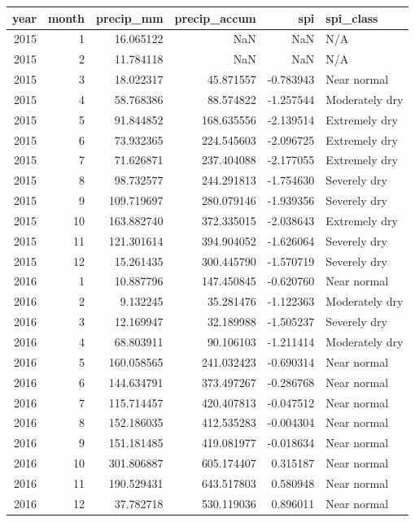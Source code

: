 \begin{tabular}{rrrrrl}
\toprule
year & month & precip\_mm & precip\_accum & spi & spi\_class \\
\midrule
2015 & 1 & 16.065122 & NaN & NaN & N/A \\
2015 & 2 & 11.784118 & NaN & NaN & N/A \\
2015 & 3 & 18.022317 & 45.871557 & -0.783943 & Near normal \\
2015 & 4 & 58.768386 & 88.574822 & -1.257544 & Moderately dry \\
2015 & 5 & 91.844852 & 168.635556 & -2.139514 & Extremely dry \\
2015 & 6 & 73.932365 & 224.545603 & -2.096725 & Extremely dry \\
2015 & 7 & 71.626871 & 237.404088 & -2.177055 & Extremely dry \\
2015 & 8 & 98.732577 & 244.291813 & -1.754630 & Severely dry \\
2015 & 9 & 109.719697 & 280.079146 & -1.939356 & Severely dry \\
2015 & 10 & 163.882740 & 372.335015 & -2.038643 & Extremely dry \\
2015 & 11 & 121.301614 & 394.904052 & -1.626064 & Severely dry \\
2015 & 12 & 15.261435 & 300.445790 & -1.570719 & Severely dry \\
2016 & 1 & 10.887796 & 147.450845 & -0.620760 & Near normal \\
2016 & 2 & 9.132245 & 35.281476 & -1.122363 & Moderately dry \\
2016 & 3 & 12.169947 & 32.189988 & -1.505237 & Severely dry \\
2016 & 4 & 68.803911 & 90.106103 & -1.211414 & Moderately dry \\
2016 & 5 & 160.058565 & 241.032423 & -0.690314 & Near normal \\
2016 & 6 & 144.634791 & 373.497267 & -0.286768 & Near normal \\
2016 & 7 & 115.714457 & 420.407813 & -0.047512 & Near normal \\
2016 & 8 & 152.186035 & 412.535283 & -0.004304 & Near normal \\
2016 & 9 & 151.181485 & 419.081977 & -0.018634 & Near normal \\
2016 & 10 & 301.806887 & 605.174407 & 0.315187 & Near normal \\
2016 & 11 & 190.529431 & 643.517803 & 0.580948 & Near normal \\
2016 & 12 & 37.782718 & 530.119036 & 0.896011 & Near normal \\

\end{tabular}
